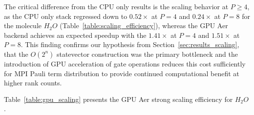 \begin{table}[!ht]
\centering
\renewcommand{\arraystretch}{1.2}
\caption{Wall-clock comparison between the serial baseline and the GPU Aer distributed stack at $P \in \{2,4,8\}$. The GPU backend uses Qiskit Aer with CUDA thrust on an NVIDIA GTX 1650 Mobile. Speedup is calculated as $T_{\text{serial}} / T_{\text{GPU}}$.}
\label{table:gpu_speedup}
\end{table}

The critical difference from the CPU only results is the scaling behavior at $P \geq 4$, as the CPU only 
stack regressed down to $0.52\times$ at $P=4$ and $0.24\times$ at $P=8$ for the molecule $H_{2}O$ (Table~\ref{table:scaling_efficiency}), whereas 
the GPU Aer backend achieves an expected speedup with the $1.41\times$ at $P=4$ and $1.51\times$ at $P=8$. This finding confirms our hypothesis 
from Section~\ref{sec:results_scaling}, that the $O(2^n)$ statevector construction was the primary bottleneck and the introduction of 
GPU acceleration of gate operations reduces this cost sufficiently for MPI Pauli term distribution to 
provide continued computational benefit at higher rank counts.

Table~\ref{table:gpu_scaling} presents the GPU Aer strong scaling efficiency for $H_{2}O$.


